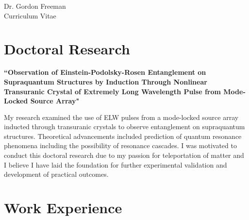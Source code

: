 \documentclass[10pt]{article} %
\begin{document}
\begin{paracol}{2} %


\parbox[top][0.12\textheight][c]{\linewidth}{ %
	\vspace{-0.04\textheight} %
	\centering %
	{\sffamily\Huge Dr. Gordon Freeman}\\\medskip %
	{\Huge\color{headings}\cvtextfont Curriculum Vitae}
}


\section{Doctoral Research}

{\raggedright\textbf{``Observation of Einstein-Podolsky-Rosen Entanglement on Supraquantum Structures by Induction Through Nonlinear Transuranic Crystal of Extremely Long Wavelength Pulse from Mode-Locked Source Array"}\\\medskip}

My research examined the use of ELW pulses from a mode-locked source array inducted through transuranic crystals to observe entanglement on supraquantum structures. Theoretical advancements included prediction of quantum resonance phenomena including the possibility of resonance cascades. I was motivated to conduct this doctoral research due to my passion for teleportation of matter and I believe I have laid the foundation for further experimental validation and development of practical outcomes.

\medskip %


\section{Work Experience}


\end{paracol}
\end{document}
